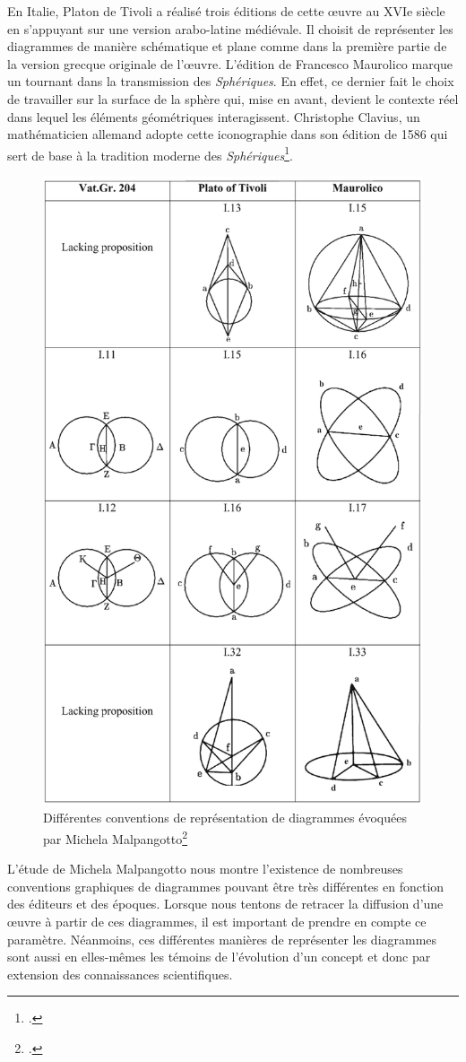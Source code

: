 En Italie, Platon de Tivoli a réalisé trois éditions de cette œuvre au XVIe siècle en s'appuyant sur une version arabo-latine médiévale. Il choisit de représenter les diagrammes de manière schématique et plane comme dans la première partie de la version grecque originale de l'œuvre. L'édition de Francesco Maurolico marque un tournant dans la transmission des \textit{Sphériques}. En effet, ce dernier fait le choix de travailler sur la surface de la sphère qui, mise en avant, devient le contexte réel dans lequel les éléments géométriques interagissent. Christophe Clavius, un mathématicien allemand adopte cette iconographie dans son édition de 1586 qui sert de base à la tradition moderne des \textit{Sphériques}\footcite{malpangottoGraphicalChoicesGeometrical2010}. 

\begin{figure}[H]
	\centering
	\includegraphics[width=0.6\linewidth]{images/conventions_diagrammes.png}
	\caption{Différentes conventions de représentation de diagrammes évoquées par Michela Malpangotto\footcite{malpangottoGraphicalChoicesGeometrical2010}}
	\label{fig:conventions}
\end{figure}


L'étude de Michela Malpangotto nous montre l'existence de nombreuses conventions graphiques de diagrammes pouvant être très différentes en fonction des éditeurs et des époques. Lorsque nous tentons de retracer la diffusion d'une œuvre à partir de ces diagrammes, il est important de prendre en compte ce paramètre. Néanmoins, ces différentes manières de représenter les diagrammes sont aussi en elles-mêmes les témoins de l'évolution d'un concept et donc par extension des connaissances scientifiques. \\

